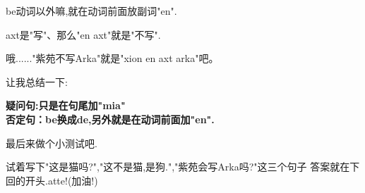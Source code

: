 be动词以外嘛,就在动词前面放副词"en".

axt是"写"、那么"en axt"就是"不写".


哦......"紫苑不写Arka"就是"xion en axt arka"吧。

让我总结一下:

\textbf{
疑问句:只是在句尾加"mia"\\
否定句：be换成de,另外就是在动词前面加"en".
}

最后来做个小测试吧.

试着写下"这是猫吗?","这不是猫,是狗.","紫苑会写Arka吗?"这三个句子
答案就在下回的开头.atte!(加油!)






